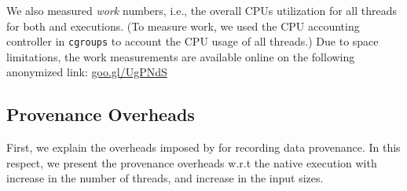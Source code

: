  We also measured  {\em work} numbers, i.e., the overall CPUs utilization for all threads for both \pthreads and \projecttitle executions. (To measure work, we used the CPU accounting controller in {\tt cgroups} to account the CPU usage of all threads.) Due to space limitations, the work measurements are available online on the following anonymized link:  \href{https://goo.gl/UgPNdS}{goo.gl/UgPNdS}





\subsection{Provenance Overheads}
\label{subsec:overheads}
First, we explain the overheads imposed by \projecttitle for recording data provenance. In this respect, we present the provenance overheads w.r.t the native \pthreads execution with increase in the number of threads, and increase in the input sizes.


